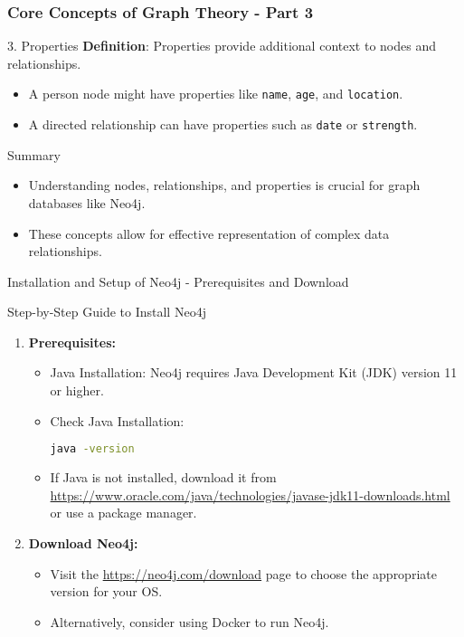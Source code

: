 \documentclass[aspectratio=169]{beamer}
\begin{document}
\begin{frame}[fragile]
    \frametitle{Core Concepts of Graph Theory - Part 3}
    \begin{block}{3. Properties}
        \textbf{Definition}: Properties provide additional context to nodes and relationships.
        \begin{example}
            \begin{itemize}
                \item A person node might have properties like \texttt{name}, \texttt{age}, and \texttt{location}.
                \item A directed relationship can have properties such as \texttt{date} or \texttt{strength}.
            \end{itemize}
        \end{example}
    \end{block}

    \begin{block}{Summary}
        \begin{itemize}
            \item Understanding nodes, relationships, and properties is crucial for graph databases like Neo4j.
            \item These concepts allow for effective representation of complex data relationships.
        \end{itemize}
    \end{block}
\end{frame}

\begin{frame}[fragile]{Installation and Setup of Neo4j - Prerequisites and Download}
  \begin{block}{Step-by-Step Guide to Install Neo4j}
    \begin{enumerate}
      \item \textbf{Prerequisites:}
        \begin{itemize}
          \item Java Installation: Neo4j requires Java Development Kit (JDK) version 11 or higher.
          \item Check Java Installation:
          \begin{lstlisting}[language=bash]
          java -version
          \end{lstlisting}
          \item If Java is not installed, download it from \url{https://www.oracle.com/java/technologies/javase-jdk11-downloads.html} or use a package manager.
        \end{itemize}

      \item \textbf{Download Neo4j:}
        \begin{itemize}
          \item Visit the \url{https://neo4j.com/download} page to choose the appropriate version for your OS.
          \item Alternatively, consider using Docker to run Neo4j.
        \end{itemize}
    \end{enumerate}
  \end{block}
\end{frame}
\end{document}
